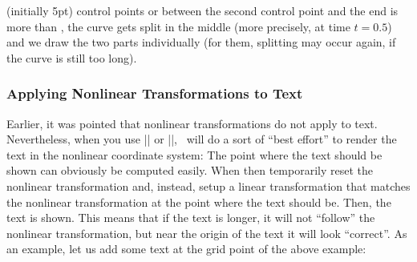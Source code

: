 \begin{enumerate}
\begin{command}{\pgfsettransformnonlinearflatness{} (initially 5pt)}
            control points or between the second control point and the end is
            more than , the curve gets split in the middle (more
            precisely, at time $t= 0.5$) and we draw the two parts individually
            (for them, splitting may occur again, if the curve is still too
            long).
\begin{codeexample}[]
\end{codeexample}
        \end{command}
\end{enumerate}


\subsubsection{Applying Nonlinear Transformations to Text}

Earlier, it was pointed that nonlinear transformations do not apply to text.
Nevertheless, when you use |\pgftext| or |\pgfnode|, \pgfname\ will do a sort
of ``best effort'' to render the text in the nonlinear coordinate system: The
point where the text should be shown can obviously be computed easily. When
then temporarily reset the nonlinear transformation and, instead, setup a
linear transformation that matches the nonlinear transformation at the point
where the text should be. Then, the text is shown. This means that if the text
is longer, it will not ``follow'' the nonlinear transformation, but near the
origin of the text it will look ``correct''. As an example, let us add some
text at the grid point of the above example:
%
\begin{codeexample}[]
\end{codeexample}


